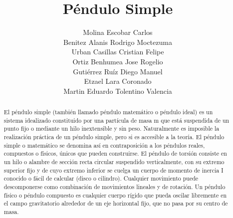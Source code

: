 \documentclass[11pt]{article}
\title{Péndulo Simple}
\author{Molina Escobar Carlos\\Benitez Alanis Rodrigo Moctezuma\\Urban Casillas Cristian Felipe\\Ortiz Benhumea Jose Rogelio\\Gutiérrez Ruíz Diego Manuel\\Etzael Lara Coronado\\Martin Eduardo Tolentino Valencia}
\date{}
\begin{document}
\maketitle

\begin{abstract}
	El péndulo simple (también llamado péndulo matemático o péndulo ideal) es un sistema idealizado constituido por una partícula de masa m que está suspendida de un punto fijo o mediante un hilo inextensible y sin peso. Naturalmente es imposible la realización práctica de un péndulo simple, pero si es accesible a la teoría. El péndulo simple o matemático se denomina así en contraposición a los péndulos reales, compuestos o físicos, únicos que pueden construirse. El péndulo de torsión consiste en un hilo o alambre de sección recta circular suspendido verticalmente, con su extremo superior fijo y de cuyo extremo inferior se cuelga un cuerpo de momento de inercia I conocido o fácil de calcular (disco o cilindro). Cualquier movimiento puede descomponerse como combinación de movimientos lineales y de rotación. Un péndulo físico o péndulo compuesto es cualquier cuerpo rígido que pueda oscilar libremente en el campo gravitatorio alrededor de un eje horizontal fijo, que no pasa por su centro de masa.
\end{abstract}
\end{document}
